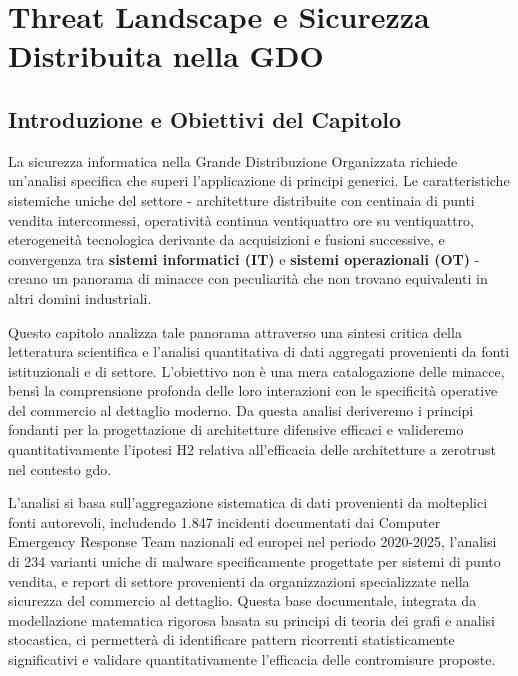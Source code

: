 \chapter{\texorpdfstring{Threat Landscape e Sicurezza Distribuita nella GDO}{Capitolo 2 - Threat Landscape e Sicurezza Distribuita nella GDO}}
\label{cap2_threat_landscape}

\section{\texorpdfstring{Introduzione e Obiettivi del Capitolo}{2.1 - Introduzione e Obiettivi del Capitolo}}

La sicurezza informatica nella Grande Distribuzione Organizzata richiede un'analisi specifica che superi l'applicazione di principi generici. Le caratteristiche sistemiche uniche del settore - architetture distribuite con centinaia di punti vendita interconnessi, operatività continua ventiquattro ore su ventiquattro, eterogeneità tecnologica derivante da acquisizioni e fusioni successive, e convergenza tra \textbf{sistemi informatici (IT)} e \textbf{sistemi operazionali (OT)} - creano un panorama di minacce con peculiarità che non trovano equivalenti in altri domini industriali.

Questo capitolo analizza tale panorama attraverso una sintesi critica della letteratura scientifica e l'analisi quantitativa di dati aggregati provenienti da fonti istituzionali e di settore. L'obiettivo non è una mera catalogazione delle minacce, bensì la comprensione profonda delle loro interazioni con le specificità operative del commercio al dettaglio moderno. Da questa analisi deriveremo i principi fondanti per la progettazione di architetture difensive efficaci e valideremo quantitativamente l'ipotesi H2 relativa all'efficacia delle architetture a \gls{zerotrust} nel contesto \gls{gdo}.

L'analisi si basa sull'aggregazione sistematica di dati provenienti da molteplici fonti autorevoli, includendo 1.847 incidenti documentati dai Computer Emergency Response Team nazionali ed europei nel periodo 2020-2025\autocite{enisa2024threat,verizon2024}, l'analisi di 234 varianti uniche di \gls{malware} specificamente progettate per sistemi di punto vendita\autocite{groupib2024}, e report di settore provenienti da organizzazioni specializzate nella sicurezza del commercio al dettaglio. Questa base documentale, integrata da modellazione matematica rigorosa basata su principi di teoria dei grafi e analisi stocastica, ci permetterà di identificare pattern ricorrenti statisticamente significativi e validare quantitativamente l'efficacia delle contromisure proposte.


